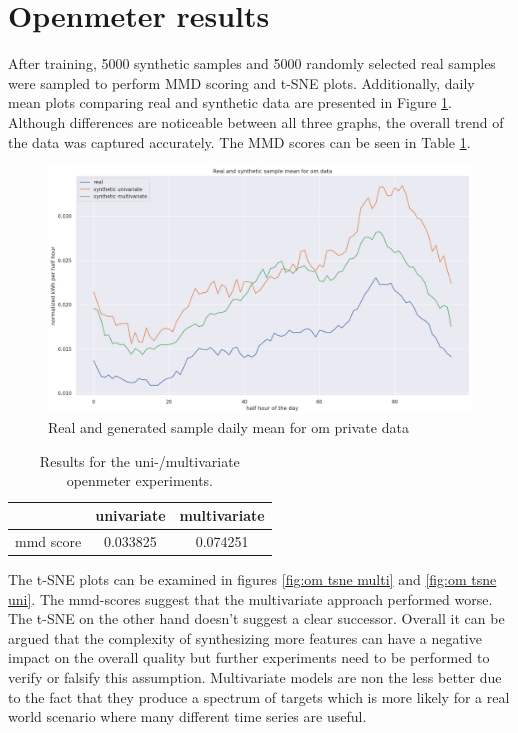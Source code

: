 \section{Openmeter results}
\label{subsec:OM res}
After training, 5000 synthetic samples and 5000 randomly selected real samples were sampled to perform MMD scoring and t-SNE plots. Additionally, daily mean plots comparing real and synthetic data are presented in Figure \ref{fig:om dm}. Although differences are noticeable between all three graphs, the overall trend of the data was captured accurately. The MMD scores can be seen in Table \ref{table:om results}.
\begin{figure}
    \centering
    \includegraphics[width=\textwidth]{images/om_dm_private.png}
    \caption{Real and generated sample daily mean for om private data}
    \label{fig:om dm}
\end{figure}
\begin{table}[h!]
    \centering
    \begin{tabular}{|c | c c|}
        \hline
         & univariate & multivariate\\
        \hline\hline
        mmd score & 0.033825 & 0.074251\\
        \hline
    \end{tabular}
    \caption{Results for the uni-/multivariate openmeter experiments.}
    \label{table:om results}
\end{table}
The t-SNE plots can be examined in figures \ref{fig:om tsne multi} and \ref{fig:om tsne uni}. The mmd-scores suggest that the multivariate approach performed worse. The t-SNE on the other hand doesn't suggest a clear successor. Overall it can be argued that the complexity of synthesizing more features can have a negative impact on the overall quality but further experiments need to be performed to verify or falsify this assumption.
Multivariate models are non the less better due to the fact that they produce a spectrum of targets which is more likely for a real world scenario where many different time series are useful.
